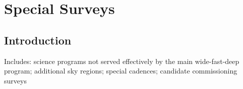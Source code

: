 \chapter[Special Surveys]{Special Surveys}
\def\chpname{specialsurveys}\label{chp:\chpname}





\section{Introduction}
\label{sec:specials:intro}


Includes: science programs not served effectively by the main
wide-fast-deep program; additional sky regions; special cadences;
candidate commissioning surveys


% 


% 


\navigationbar
